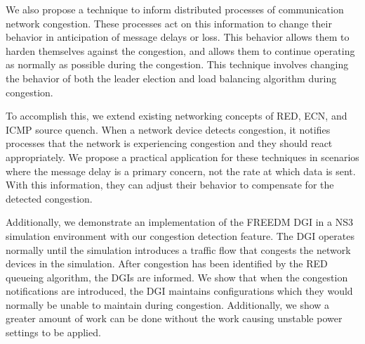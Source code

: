 We also propose a technique to inform distributed processes of communication network congestion.
These processes act on this information to change their behavior in anticipation of message delays or loss.
This behavior allows them to harden themselves against the congestion, and allows them to continue operating as normally as possible during the congestion.
This technique involves changing the behavior of both the leader election\cite{INVITATIONELECTION} and load balancing algorithm during congestion.

To accomplish this, we extend existing networking concepts of \ac{RED}, \ac{ECN}\cite{RFCECN}, and ICMP source quench\cite{RFCSOURCEQUENCH}.
When a network device detects congestion, it notifies processes that the network is experiencing congestion and they should react appropriately.
We propose a practical application for these techniques in scenarios where the message delay is a primary concern, not the rate at which data is sent.
With this information, they can adjust their behavior to compensate for the detected congestion.

Additionally, we demonstrate an implementation of the \ac{FREEDM} \ac{DGI} in a \ac{NS3} simulation environment\cite{NS3} with our congestion detection feature.
The \ac{DGI} operates normally until the simulation introduces a traffic flow that congests the network devices in the simulation.
After congestion has been identified by the \ac{RED} queueing algorithm, the \ac{DGI}s are informed. %
We show that when the congestion notifications are introduced, the \ac{DGI} maintains configurations which they would normally be unable to maintain during congestion.
Additionally, we show a greater amount of work can be done without the work causing unstable power settings to be applied.


